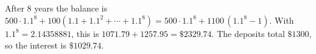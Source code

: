 After $8$ years the balance is $500\cdot1.1^8+100(1.1+1.1^2+\cdots+1.1^8)=500\cdot1.1^8+1100\,(1.1^8-1)$. With $1.1^8=2.14358881$, this is $1071.79+1257.95=\boxed{\$2329.74}$. The deposits total $\$1300$, so the interest is $\$1029.74$.
